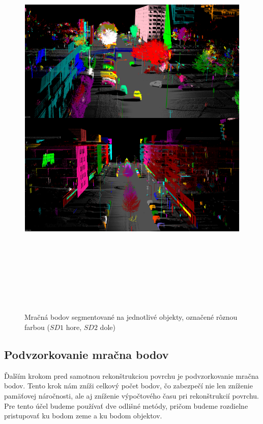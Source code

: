 \newpage\vfill
\begin{figure}[ht]
  \centering
  \includegraphics[width=16cm, height=20cm]{img/segmentation.png}
  \caption{Mračná bodov segmentované na jednotlivé objekty, označené rôznou farbou ($SD1$ hore, $SD2$ dole)} 
  \label{fig:cpc_seg}
\end{figure} 
\vfill\clearpage

\subsection{Podvzorkovanie mračna bodov}
\noindent Ďalším krokom pred samotnou rekonštrukciou povrchu je podvzorkovanie mračna bodov. Tento krok nám zníži celkový počet bodov, čo zabezpečí nie len zníženie pamäťovej náročnosti, ale aj zníženie výpočtového času pri rekonštrukcií povrchu. Pre tento účel budeme používať dve odlišné metódy, pričom budeme rozdielne pristupovať ku bodom zeme a ku bodom objektov.
